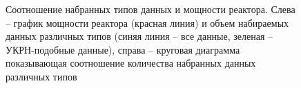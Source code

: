 \begin{figure}[H]
  \begin{minipage}[ht]{0.49\linewidth}
  \end{minipage}
  \hfill
  \begin{minipage}[ht]{0.49\linewidth}
  \end{minipage}
	\caption[Соотношение набранных типов данных и мощности реактора]{Соотношение набранных типов данных и мощности реактора. Слева -- график мощности реактора (красная линия) и объем набираемых данных различных типов (синяя линия -- все данные, зеленая -- УКРН-подобные данные), справа -- круговая диаграмма показывающая соотношение количества набранных данных различных типов}
	\label{img:datadiagram}
\end{figure}
